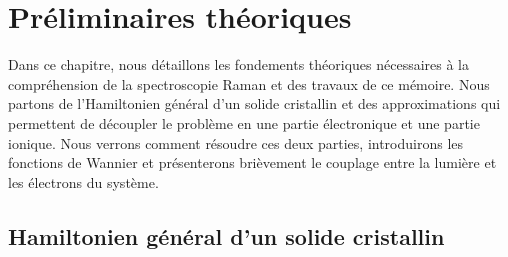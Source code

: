 \chapter{Préliminaires théoriques}\label{chap:théorie}

Dans ce chapitre, nous détaillons les fondements théoriques nécessaires à la compréhension de la spectroscopie Raman et des travaux de ce mémoire. Nous partons de l'Hamiltonien général d'un solide cristallin et des approximations qui permettent de découpler le problème en une partie électronique et une partie ionique. Nous verrons comment résoudre ces deux parties, introduirons les fonctions de Wannier et présenterons brièvement le couplage entre la lumière et les électrons du système. 

\section{Hamiltonien général d'un solide cristallin}\label{sec:2.1}

